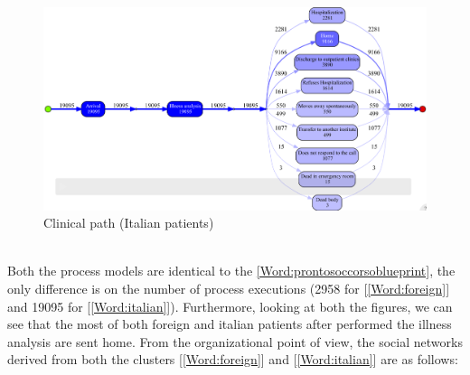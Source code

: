 \begin{figure} [htbp]
\includegraphics[width=\textwidth , keepaspectratio]{ProntoSoccorsoInductiveVisualMinerItalians}
\caption{Clinical path (Italian patients)}
\end{figure}\\
Both the process models are identical to the \ref{Word:prontosoccorsoblueprint}, the only difference is on the number of process executions (2958 for [\ref{Word:foreign}] and 19095 for [\ref{Word:italian}]). Furthermore, looking at both the figures, we can see that the most of both foreign and italian patients after performed the illness analysis are sent home. From the organizational point of view, the social networks derived from both the clusters [\ref{Word:foreign}] and [\ref{Word:italian}] are as follows:
